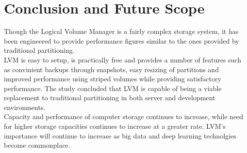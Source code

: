 \chapter{Conclusion and Future Scope}
Though the Logical Volume Manager is a fairly complex storage system, it has
been engineered to provide performance figures similar to the ones provided by
traditional partitioning.\\

LVM is easy to setup, is practically free and provides a number of features such
as convinient backups through snapshots, easy resizing of partitions and
improved performance using striped volumes while providing satisfactory
performance. The study concluded that LVM is capable of being a viable
replacement to traditional partitioning in both server and development
environments.\\

Capacity and performance of computer storage continues to increase, while need
for higher storage capacities continues to increase at a greater rate. LVM's
importance will continue to increase as big data and deep learning technolgies
become commonplace.
